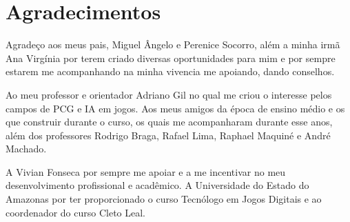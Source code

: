 \section*{Agradecimentos}

Agradeço aos meus pais, Miguel Ângelo e Perenice Socorro, além a minha irmã Ana Virgínia por terem criado diversas oportunidades para mim e por sempre estarem me acompanhando na minha vivencia me apoiando, dando conselhos.

Ao meu professor e orientador Adriano Gil no qual me criou o interesse pelos campos de PCG e IA em jogos. Aos meus amigos da época de ensino médio e os que construir durante o curso, os quais me acompanharam durante esse anos, além dos professores Rodrigo Braga, Rafael Lima, Raphael Maquiné e André Machado.

A Vivian Fonseca por sempre me apoiar e a me incentivar no meu desenvolvimento profissional e acadêmico. A Universidade do Estado do Amazonas por ter proporcionado o curso Tecnólogo em Jogos Digitais e ao coordenador do curso Cleto Leal.